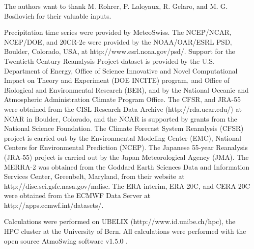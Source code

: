 \documentclass{ametsoc}
\begin{document}
%
\acknowledgments
The authors want to thank M. Rohrer, P. Laloyaux, R. Gelaro, and M. G. Bosilovich for their valuable inputs.

Precipitation time series were provided by MeteoSwiss. The NCEP/NCAR, NCEP/DOE, and 20CR-2c were provided by the NOAA/OAR/ESRL PSD, Boulder, Colorado, USA, at http://www.esrl.noaa.gov/psd/. Support for the Twentieth Century Reanalysis Project dataset is provided by the U.S. Department of Energy, Office of Science Innovative and Novel Computational Impact on Theory and Experiment (DOE INCITE) program, and Office of Biological and Environmental Research (BER), and by the National Oceanic and Atmospheric Administration Climate Program Office. The CFSR, and JRA-55 were obtained from the CISL Research Data Archive (http://rda.ucar.edu/) at NCAR in Boulder, Colorado, and the NCAR is supported by grants from the National Science Foundation. The Climate Forecast System Reanalysis (CFSR) project is carried out by the Environmental Modeling Center (EMC), National Centers for Environmental Prediction (NCEP). The Japanese 55-year Reanalysis (JRA-55) project is carried out by the Japan Meteorological Agency (JMA). The MERRA-2 was obtained from the Goddard Earth Sciences Data and Information Services Center, Greenbelt, Maryland, from their website at http://disc.sci.gsfc.nasa.gov/mdisc. The ERA-interim, ERA-20C, and CERA-20C were obtained from the ECMWF Data Server at http://apps.ecmwf.int/datasets/. 

Calculations were performed on UBELIX (http://www.id.unibe.ch/hpc), the HPC cluster at the University of Bern. All calculations were performed with the open source AtmoSwing software v1.5.0 \citep{Horton2017a}.


%



\end{document}
